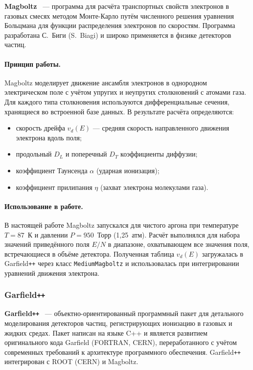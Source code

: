 \documentclass[12pt]{article}
\begin{document}
\textbf{Magboltz}~\cite{magboltz} --- программа для расчёта транспортных
свойств электронов в газовых смесях методом Монте-Карло путём численного
решения уравнения Больцмана для функции распределения электронов по
скоростям. Программа разработана С.~Биги (S.~Biagi) и широко применяется
в физике детекторов частиц.

\paragraph{Принцип работы.}
Magboltz моделирует движение ансамбля электронов в однородном электрическом
поле с учётом упругих и неупругих столкновений с атомами газа. Для каждого
типа столкновения используются дифференциальные сечения, хранящиеся во
встроенной базе данных. В результате расчёта определяются:
\begin{itemize}
  \item скорость дрейфа $v_d(E)$ --- средняя скорость направленного движения
        электрона вдоль поля;
  \item продольный $D_L$ и поперечный $D_T$ коэффициенты диффузии;
  \item коэффициент Таунсенда $\alpha$ (ударная ионизация);
  \item коэффициент прилипания $\eta$ (захват электрона молекулами газа).
\end{itemize}

\paragraph{Использование в работе.}
В настоящей работе Magboltz запускался для чистого аргона при температуре
$T = 87$~К и давлении $P = 950$~Торр (1,25~атм). Расчёт выполнялся для
набора значений приведённого поля $E/N$ в диапазоне, охватывающем все
значения поля, встречающиеся в объёме детектора. Полученная таблица
$v_d(E)$ загружалась в Garfield\texttt{++} через класс \texttt{MediumMagboltz}
и использовалась при интегрировании уравнений движения электрона.

\subsubsection*{Garfield\texttt{++}}

\textbf{Garfield\texttt{++}}~\cite{garfield} --- объектно-ориентированный
программный пакет для детального моделирования детекторов частиц,
регистрирующих ионизацию в газовых и жидких средах. Пакет написан на языке
C++ и является развитием оригинального кода Garfield (FORTRAN, CERN),
переработанного с учётом современных требований к архитектуре программного
обеспечения. Garfield\texttt{++} интегрирован с ROOT (CERN) и Magboltz.
\end{document}
